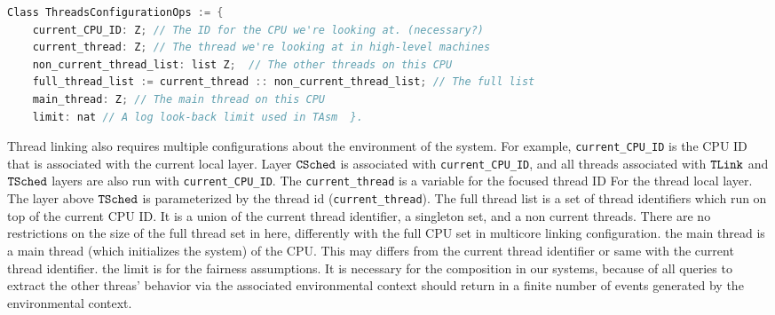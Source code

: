 \begin{lstlisting}[language=C]
Class ThreadsConfigurationOps := {      
    current_CPU_ID: Z; // The ID for the CPU we're looking at. (necessary?) 
    current_thread: Z; // The thread we're looking at in high-level machines
    non_current_thread_list: list Z;  // The other threads on this CPU 
    full_thread_list := current_thread :: non_current_thread_list; // The full list
    main_thread: Z; // The main thread on this CPU 
    limit: nat // A log look-back limit used in TAsm  }.
\end{lstlisting}

Thread linking also requires multiple configurations about 
the environment of the system. 
For example, \lstinline$current_CPU_ID$ is the CPU ID that is 
associated with the current local layer.
Layer ${{\mathrm{\texttt{CSched}}}}$ is associated with \lstinline$current_CPU_ID$, 
and all threads associated with ${{\mathrm{\texttt{TLink}}}}$ and ${{\mathrm{\texttt{TSched}}}}$ layers 
are also run with  \lstinline$current_CPU_ID$.
The \lstinline$current_thread$ 
is a variable for the focused thread ID For the thread local layer. 
The layer above ${{\mathrm{\texttt{TSched}}}}$ is parameterized by the thread id (\lstinline$current_thread$). 
The full thread list is a set of thread identifiers 
which run on top of the current CPU ID. 
It is a union of the current thread identifier, a singleton set, 
and a non current threads. 
There are no restrictions on the size of the full thread set in here,
differently with the full CPU set in multicore linking configuration.
the main thread is a main thread (which initializes the system) of the CPU. 
This may differs from the current thread identifier or same with the current thread identifier.
the limit is for the fairness assumptions. 
It is necessary for the composition in our systems, 
because of all queries to extract the other threas' behavior via the associated environmental context 
should return in a finite number of events generated by the environmental context. 

